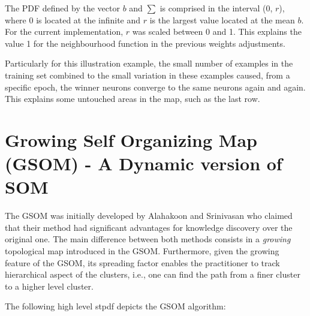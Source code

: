 \vspace{0.2cm}

The PDF defined by the vector $b$ and $\sum$ is comprised in the interval ($0$, $r$), where $0$ is located at the infinite and $r$ is the largest value located at the mean $b$. For the current implementation, $r$ was scaled between 0 and 1. This explains the value 1 for the neighbourhood function in the previous weights adjustments.

Particularly for this illustration example, the small number of examples in the training set combined to the small variation in these examples caused, from a specific epoch, the winner neurons converge to the same neurons again and again. This explains some untouched areas in the map, such as the last row. 






\section{Growing Self Organizing Map (GSOM) - A Dynamic version of SOM}

The GSOM was initially developed by Alahakoon and Srinivasan \cite{Alahakoon:2000} who claimed that their method had significant advantages for knowledge discovery over the original one. The main difference between both methods consists in a \textit{growing} topological map introduced in the GSOM. Furthermore, given the growing feature of the GSOM, its spreading factor enables the practitioner to track hierarchical aspect of the clusters, i.e., one can find the path from a finer cluster to a higher level cluster.  

The following high level stpdf depicts the GSOM algorithm:

